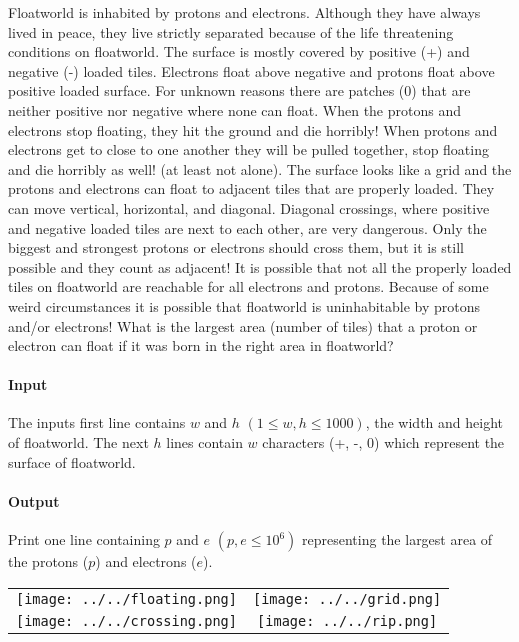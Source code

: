 




Floatworld is inhabited by protons and electrons.
 Although they have always lived in peace, they live strictly separated because of the life threatening conditions on floatworld. 
 The surface is mostly covered by positive (+) and negative (-) loaded tiles.
 Electrons float above negative and protons float above positive loaded surface. 
 For unknown reasons there are patches (0) that are neither positive nor negative where none can float. 
 When the protons and electrons stop floating, they hit the ground and die horribly!  
 When protons and electrons get to close to one another they will be pulled together, stop floating and die horribly as well! (at least not alone). 
 The surface looks like a grid and the protons and electrons can float to adjacent tiles that are properly loaded. 
 They can move vertical, horizontal, and diagonal. 
 Diagonal crossings, where positive and negative loaded tiles are next to each other, are very dangerous. 
 Only the biggest and strongest protons or electrons should cross them, but it is still possible and they count as adjacent! 
 It is possible that not all the properly loaded tiles on floatworld are reachable for all electrons and protons. 
 Because of some weird circumstances it is possible that floatworld is uninhabitable by protons and/or electrons! 
 What is the largest area (number of tiles) that a proton or electron can float if it was born in the right area in floatworld?

\paragraph*{Input}

The inputs first line contains $w$ and $h$ $(1 \leq w, h \leq 1000)$, the width and height of floatworld. The next $h$ lines contain $w$ characters (+, -, 0) which represent the surface of floatworld.

\paragraph*{Output}

Print one line containing $p$ and $e$ $(p,e \leq 10^6)$ representing the largest area of the protons ($p$) and electrons ($e$).


\begin{samples}
\end{samples}

\begin{tabular}{cc}
  \texttt{[image: ../../floating.png]}
    & \texttt{[image: ../../grid.png]} \\
  \texttt{[image: ../../crossing.png]}
    & \texttt{[image: ../../rip.png]} \\
\end{tabular}



